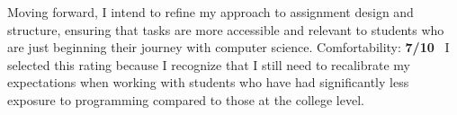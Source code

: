 \hspace{2ex} Moving forward, I intend to refine my approach to assignment design and structure, ensuring that tasks are more accessible and relevant to students who are just beginning their journey with computer science.
\vspace{2ex}
\hspace{2ex} Comfortability: \textbf{7/10}\
\hspace{2ex} I selected this rating because I recognize that I still need to recalibrate my expectations when working with students who have had significantly less exposure to programming compared to those at the college level.




